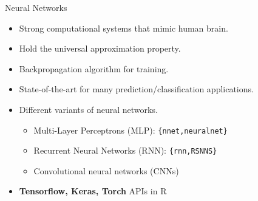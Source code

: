 \documentclass[12pt,ignorenonframetext,]{beamer}
\providecommand{\tightlist}{%
  \setlength{\itemsep}{0pt}\setlength{\parskip}{0pt}}
\begin{document}
\begin{frame}{Neural Networks}
\protect\hypertarget{neural-networks}{}

\begin{itemize}
\tightlist
\item
  Strong computational systems that mimic human brain.
\item
  Hold the universal approximation property.
\item
  Backpropagation algorithm for training.
\item
  State-of-the-art for many prediction/classification applications.
\item
  Different variants of neural networks.

  \begin{itemize}
      \item Multi-Layer Perceptrons (MLP): \texttt{\{nnet,neuralnet\}}
      \item Recurrent Neural Networks (RNN): \texttt{\{rnn,RSNNS\}}
      \item Convolutional neural networks (CNNs)
    \end{itemize}
\item
  \textbf{Tensorflow, Keras, Torch} APIs in R
\end{itemize}

\end{frame}
\end{document}
